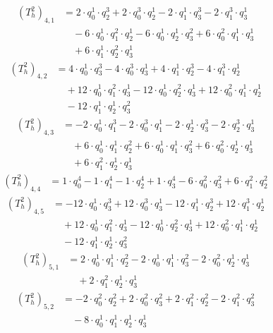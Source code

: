 \begin{align*}(T_{h}^2)_{4,1}&=2\cdot q_0^{1}\cdot q_2^{3}+2\cdot q_0^{3}\cdot q_2^{1}-2\cdot q_1^{1}\cdot q_3^{3}-2\cdot q_1^{3}\cdot q_3^{1}\\
&\quad -6\cdot q_0^{1}\cdot q_1^{2}\cdot q_2^{1}-6\cdot q_0^{1}\cdot q_2^{1}\cdot q_3^{2}+6\cdot q_0^{2}\cdot q_1^{1}\cdot q_3^{1}\\
&\quad +6\cdot q_1^{1}\cdot q_2^{2}\cdot q_3^{1}\end{align*}
\begin{align*}(T_{h}^2)_{4,2}&=4\cdot q_0^{1}\cdot q_3^{3}-4\cdot q_0^{3}\cdot q_3^{1}+4\cdot q_1^{1}\cdot q_2^{3}-4\cdot q_1^{3}\cdot q_2^{1}\\
&\quad +12\cdot q_0^{1}\cdot q_1^{2}\cdot q_3^{1}-12\cdot q_0^{1}\cdot q_2^{2}\cdot q_3^{1}+12\cdot q_0^{2}\cdot q_1^{1}\cdot q_2^{1}\\
&\quad -12\cdot q_1^{1}\cdot q_2^{1}\cdot q_3^{2}\end{align*}
\begin{align*}(T_{h}^2)_{4,3}&=-2\cdot q_0^{1}\cdot q_1^{3}-2\cdot q_0^{3}\cdot q_1^{1}-2\cdot q_2^{1}\cdot q_3^{3}-2\cdot q_2^{3}\cdot q_3^{1}\\
&\quad +6\cdot q_0^{1}\cdot q_1^{1}\cdot q_2^{2}+6\cdot q_0^{1}\cdot q_1^{1}\cdot q_3^{2}+6\cdot q_0^{2}\cdot q_2^{1}\cdot q_3^{1}\\
&\quad +6\cdot q_1^{2}\cdot q_2^{1}\cdot q_3^{1}\end{align*}
\begin{align*}(T_{h}^2)_{4,4}&=1\cdot q_0^{4}-1\cdot q_1^{4}-1\cdot q_2^{4}+1\cdot q_3^{4}-6\cdot q_0^{2}\cdot q_3^{2}+6\cdot q_1^{2}\cdot q_2^{2}\end{align*}
\begin{align*}(T_{h}^2)_{4,5}&=-12\cdot q_0^{1}\cdot q_3^{3}+12\cdot q_0^{3}\cdot q_3^{1}-12\cdot q_1^{1}\cdot q_2^{3}+12\cdot q_1^{3}\cdot q_2^{1}\\
&\quad +12\cdot q_0^{1}\cdot q_1^{2}\cdot q_3^{1}-12\cdot q_0^{1}\cdot q_2^{2}\cdot q_3^{1}+12\cdot q_0^{2}\cdot q_1^{1}\cdot q_2^{1}\\
&\quad -12\cdot q_1^{1}\cdot q_2^{1}\cdot q_3^{2}\end{align*}
\begin{align*}(T_{h}^2)_{5,1}&=2\cdot q_0^{1}\cdot q_1^{1}\cdot q_2^{2}-2\cdot q_0^{1}\cdot q_1^{1}\cdot q_3^{2}-2\cdot q_0^{2}\cdot q_2^{1}\cdot q_3^{1}\\
&\quad +2\cdot q_1^{2}\cdot q_2^{1}\cdot q_3^{1}\end{align*}
\begin{align*}(T_{h}^2)_{5,2}&=-2\cdot q_0^{2}\cdot q_2^{2}+2\cdot q_0^{2}\cdot q_3^{2}+2\cdot q_1^{2}\cdot q_2^{2}-2\cdot q_1^{2}\cdot q_3^{2}\\
&\quad -8\cdot q_0^{1}\cdot q_1^{1}\cdot q_2^{1}\cdot q_3^{1}\end{align*}
